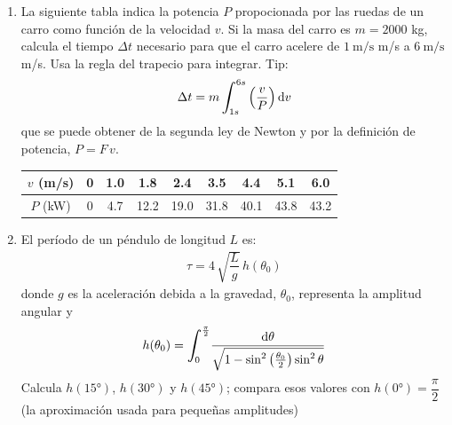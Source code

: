 \begin{enumerate}
\item La siguiente tabla indica la potencia $P$ propocionada por las ruedas de un carro como función de la velocidad $v$. Si la masa del carro es $m = 2000$ kg, calcula el tiempo $\Delta t$ necesario para que el carro acelere de $\SI{1}{\meter\per\second}$ m/s a $\SI{6}{\meter\per\second}$ m/s. Usa la regla del trapecio para integrar. Tip:
\begin{align*}
\Delta t = m \, \scaleint{6ex}_{\bs 1s}^{6s} \left( \dfrac{v}{P} \right) \dd{v}
\end{align*}
que se puede obtener de la segunda ley de Newton y por la definición de potencia, $P = F \, v$.
\begin{center}
\begin{tabular}{c | c | c | c | c | c | c | c | c}
$v$ (m/s) & 0 & 1.0 & 1.8 & 2.4 & 3.5 & 4.4 & 5.1 & 6.0 \\ \hline
$P$ (kW)  & 0 & 4.7 & 12.2 & 19.0 & 31.8 & 40.1 & 43.8 & 43.2 
\end{tabular}
\end{center}
\item El período de un péndulo de longitud $L$ es:
\begin{align*}
\tau = 4 \, \sqrt{\dfrac{L}{g}} \, h(\theta_{0})
\end{align*}
donde $g$ es la aceleración debida a la gravedad, $\theta_{0}$, representa la amplitud angular y 
\begin{align*}
h (\theta_{0}) =  \scaleint{6ex}_{\bs 0}^{\frac{\pi}{2}} \dfrac{\dd{\theta}}{\sqrt{1 - \sin^{2} \left( \frac{\theta_{0}}{2}\right) \sin^{2} \theta}}
\end{align*}
Calcula $h (\ang{15})$, $h (\ang{30})$ y $h (\ang{45})$; compara esos valores con $h (\ang{0}) = \dfrac{\pi}{2}$ (la aproximación usada para pequeñas amplitudes)
\end{enumerate}

